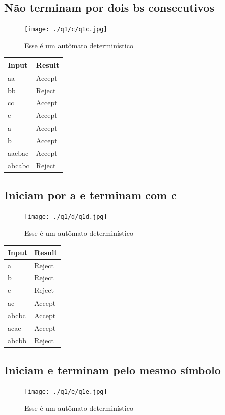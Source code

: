 \documentclass[11pt]{article}
\begin{document}
\pagebreak
\subsection{Não terminam por dois bs consecutivos}
\label{sec:org9543220}
\begin{figure}[htbp]
\centering
\texttt{[image: ./q1/c/q1c.jpg]}
\caption{\label{fig:org08cb597}
Esse é um autômato determinístico}
\end{figure}

\begin{center}
\begin{tabular}{ll}
Input & Result\\
\hline
aa & Accept\\
bb & Reject\\
cc & Accept\\
c & Accept\\
a & Accept\\
b & Accept\\
aacbac & Accept\\
abcabc & Reject\\
\end{tabular}
\end{center}
\pagebreak
\subsection{Iniciam por a e terminam com c}
\label{sec:org5e495c6}
\begin{figure}[htbp]
\centering
\texttt{[image: ./q1/d/q1d.jpg]}
\caption{\label{fig:org77f4442}
Esse é um autômato determinístico}
\end{figure}

\begin{center}
\begin{tabular}{ll}
Input & Result\\
\hline
a & Reject\\
b & Reject\\
c & Reject\\
ac & Accept\\
abcbc & Accept\\
acac & Accept\\
abcbb & Reject\\
\end{tabular}
\end{center}
\pagebreak
\subsection{Iniciam e terminam pelo mesmo símbolo}
\label{sec:orgeafa2e3}
\begin{figure}[htbp]
\centering
\texttt{[image: ./q1/e/q1e.jpg]}
\caption{\label{fig:org5146e5c}
Esse é um autômato determinístico}
\end{figure}
\end{document}
